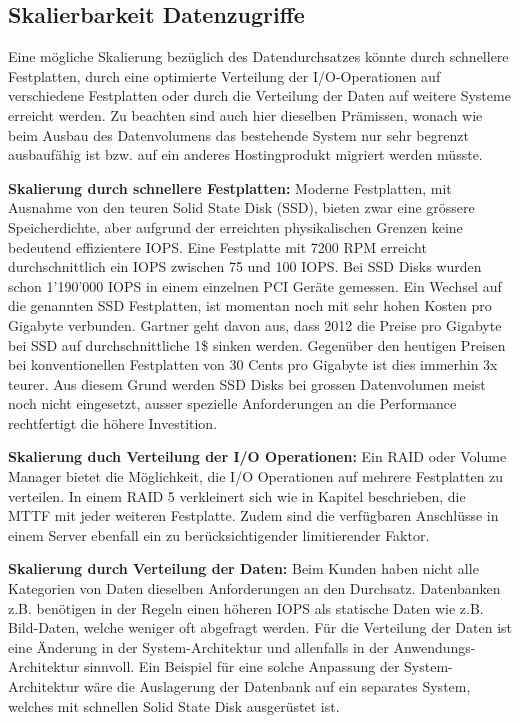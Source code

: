 \subsection{Skalierbarkeit Datenzugriffe}
Eine mögliche Skalierung bezüglich des Datendurchsatzes könnte durch schnellere Festplatten, durch eine optimierte Verteilung der I/O-Operationen auf verschiedene Festplatten oder durch die Verteilung der Daten auf weitere Systeme erreicht werden. Zu beachten sind auch hier dieselben Prämissen, wonach wie beim Ausbau des Datenvolumens das bestehende System nur sehr begrenzt ausbaufähig ist bzw. auf ein anderes Hostingprodukt migriert werden müsste.

\textbf{Skalierung durch schnellere Festplatten:}
Moderne Festplatten, mit Ausnahme von den teuren Solid State Disk (SSD), bieten zwar eine grössere Speicherdichte, aber aufgrund der erreichten physikalischen Grenzen keine bedeutend effizientere IOPS. Eine Festplatte mit 7200 RPM erreicht durchschnittlich ein IOPS zwischen 75 und 100 IOPS. Bei SSD Disks wurden schon 1'190'000 IOPS in einem einzelnen PCI Geräte gemessen.\cite{Symantec2011} \cite{Fusionio} 
Ein Wechsel auf die genannten SSD Festplatten, ist momentan noch mit sehr hohen Kosten pro Gigabyte verbunden. Gartner geht davon aus, dass 2012 die Preise pro Gigabyte bei SSD auf durchschnittliche 1\$ sinken werden. Gegenüber den heutigen Preisen bei konventionellen Festplatten von 30 Cents pro Gigabyte ist dies immerhin 3x teurer. Aus diesem Grund werden SSD Disks bei grossen Datenvolumen meist noch nicht eingesetzt, ausser spezielle Anforderungen an die Performance rechtfertigt die höhere Investition. \cite{AgamShah2011}

\textbf{Skalierung duch Verteilung der I/O Operationen:}
Ein RAID oder Volume Manager bietet die Möglichkeit, die I/O Operationen auf mehrere Festplatten zu verteilen. In einem RAID 5 verkleinert sich wie in Kapitel  beschrieben, die MTTF mit jeder weiteren Festplatte. Zudem sind die verfügbaren Anschlüsse in einem Server ebenfall ein zu berücksichtigender limitierender Faktor.

\textbf{Skalierung durch Verteilung der Daten:}
Beim Kunden haben nicht alle Kategorien von Daten dieselben Anforderungen an den Durchsatz. Datenbanken z.B. benötigen in der Regeln einen höheren IOPS als statische Daten wie z.B. Bild-Daten, welche weniger oft abgefragt werden. Für die Verteilung der Daten ist eine Änderung in der System-Architektur und allenfalls in der Anwendungs-Architektur sinnvoll. Ein Beispiel für eine solche Anpassung der System-Architektur wäre die Auslagerung der Datenbank auf ein separates System, welches mit schnellen Solid State Disk ausgerüstet ist. 

